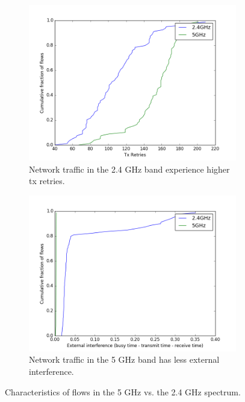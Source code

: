 \begin{figure}
\hspace*{\fill} %
\begin{subfigure}{0.45\textwidth}
\includegraphics[width=\linewidth]{figure/retries(2g_vs_5g).png}
\caption{Network traffic in the 2.4 GHz band experience higher tx retries.} 
\label{fig:retries}
\end{subfigure}
\hspace*{\fill} %
\begin{subfigure}{0.5\textwidth}
\includegraphics[width=\linewidth]{figure/external_interference(2g_vs_5g).png}
\caption{Network traffic in the 5 GHz band has less external interference.} 
\label{fig:interference}
\end{subfigure}
\caption{Characteristics of flows in the 5 GHz vs. the 2.4 GHz spectrum.} 
\label{fig:5gvs2g}
\end{figure}

